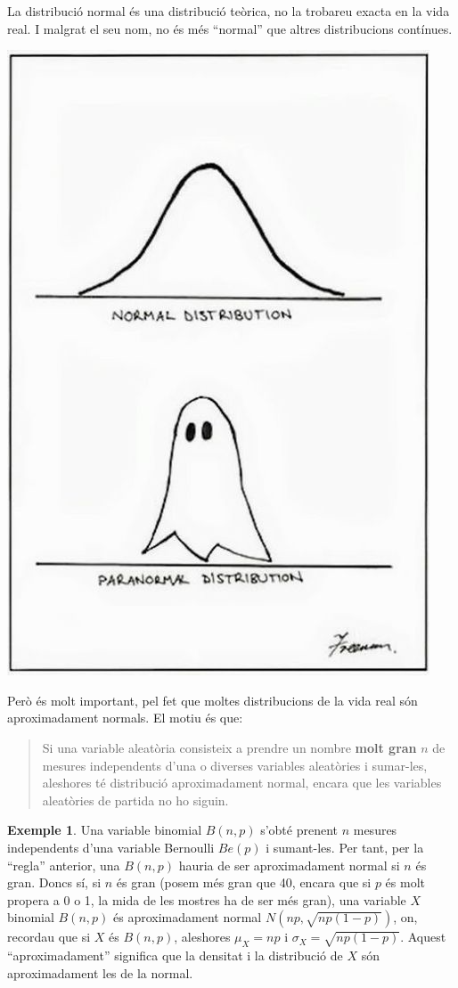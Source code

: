 \documentclass[
]{book}
\theoremstyle{definition}
\theoremstyle{definition}
\newtheorem{example}{Exemple}[chapter]
\theoremstyle{definition}
\theoremstyle{remark}
\begin{document}
La distribució normal és una distribució teòrica, no la trobareu exacta en la vida real. I malgrat el seu nom, no és més ``normal'' que altres distribucions contínues.

\begin{center}\includegraphics[width=0.4\linewidth]{Bioestadistica-II_files/figure-html/paranormal} \end{center}

Però és molt important, pel fet que moltes distribucions de la vida real són aproximadament normals. El motiu és que:

\begin{quote}
Si una variable aleatòria consisteix a prendre un nombre \textbf{molt gran} \(n\) de mesures independents d'una o diverses variables aleatòries i sumar-les, aleshores té distribució aproximadament normal, encara que les variables aleatòries de partida no ho siguin.
\end{quote}

\begin{example}
\protect\hypertarget{exm:unnamed-chunk-68}{}{\label{exm:unnamed-chunk-68} }Una variable binomial \(B(n,p)\) s'obté prenent \(n\) mesures independents d'una variable Bernoulli \(Be(p)\) i sumant-les. Per tant, per la ``regla'' anterior, una \(B(n,p)\) hauria de ser aproximadament normal si \(n\) és gran. Doncs sí, si \(n\) és gran (posem més gran que 40, encara que si \(p\) és molt propera a 0 o 1, la mida de les mostres ha de ser més gran), una variable \(X\) binomial \(B(n,p)\) és aproximadament normal \(N(np,\sqrt{np(1-p)})\), on, recordau que si \(X\) és \(B(n,p)\), aleshores \(\mu_X=np\) i \(\sigma_X=\sqrt{np(1-p)}\). Aquest ``aproximadament'' significa que la densitat i la distribució de \(X\) són aproximadament les de la normal.
\end{example}
\end{document}
